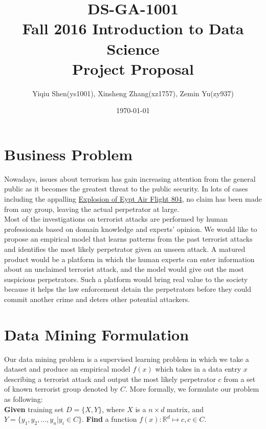 \documentclass{article}
\begin{document}
\pagestyle{fancy}
\fancyhf{}

\title{DS-GA-1001 \\ Fall 2016 Introduction to Data Science\\ Project Proposal}
\date{\today}
\author{Yiqiu Shen(ys1001), Xinsheng Zhang(xz1757), Zemin Yu(zy937)}
\maketitle

\section{Business Problem}

Nowadays, issues about terrorism has gain increasing attention from the general public as it becomes the greatest threat to the public security. In lots of cases including the appalling \href{https://en.wikipedia.org/wiki/EgyptAir_Flight_804}{Explosion of Eypt Air Flight 804}, no claim has been made from any group, leaving the actual perpetrator at large. \\

\noindent Most of the investigations on terrorist attacks are performed by human professionals based on domain knowledge and experts' opinion. We would like to propose an empirical model that learns patterns from the past terrorist attacks and identifies the most likely perpetrator given an unseen attack. A matured product would be a platform in which the human experts can enter information about an unclaimed terrorist attack, and the model would give out the most suspicious perpetrators. Such a platform would bring real value to the society because it helps the law enforcement detain the perpetrators before they could commit another crime and deters other potential attackers.


\section{Data Mining Formulation}
Our data mining problem is a supervised learning problem in which we take a dataset and produce an empirical model $f(x)$ which takes in a data entry $x$ describing a terrorist attack and output the most likely perpetrator $c$ from a set of known terrorist group denoted by $C$. More formally, we formulate our problem as following:\\

\noindent \textbf{Given} training set $D=\{X,Y\}$, where $X$ is a $n \times d$ matrix, and $Y = \{ y_1, y_2, ..., y_n | y_i \in C\}$. \noindent \textbf{Find} a function $f(x): \mathbb{R}^d \mapsto	c, c \in C$.\\
\end{document}
